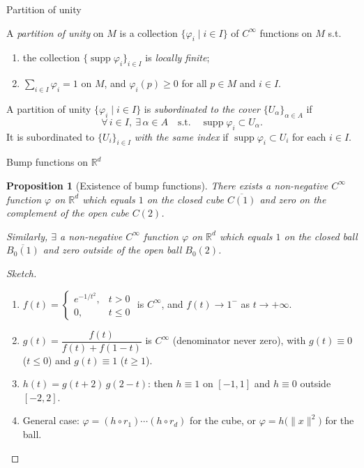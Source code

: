 \documentclass[10pt]{beamer}
\newtheorem{proposition}{Proposition}
\newcommand{\R}{\mathbb{R}}
\newcommand{\supp}{\operatorname{supp}}
\begin{document}
\begin{frame}{Partition of unity}
	\begin{definition}
		A \emph{partition of unity} on $M$ is a collection
		$\{\varphi_i \mid i \in I\}$ of $C^\infty$ functions on $M$ s.t.
		\begin{enumerate}
			\item[(a)] the collection $\{\supp \varphi_i\}_{i \in I}$ is
			      \emph{locally finite};
			\item[(b)] $\displaystyle\sum_{i \in I} \varphi_i = 1$ on $M$, and
			      $\varphi_i(p) \geq 0$ for all $p \in M$ and $i \in I$.
		\end{enumerate}
	\end{definition}
	\begin{definition}[Subordination]
		A partition of unity $\{\varphi_i \mid i \in I\}$ is
		\emph{subordinated to the cover} $\{U_\alpha\}_{\alpha \in A}$ if
		\[
			\forall\, i \in I,\ \exists\, \alpha \in A \quad \text{s.t.}\quad
			\supp \varphi_i \subset U_\alpha .
		\]
		It is subordinated to $\{U_i\}_{i \in I}$ \emph{with the same index}
		if $\supp \varphi_i \subset U_i$ for each $i \in I$.
	\end{definition}
\end{frame}

\begin{frame}{Bump functions on $\R^d$}
	\begin{proposition}[Existence of bump functions]
		There exists a non-negative $C^\infty$ function $\varphi$ on $\R^d$
		which equals $1$ on the closed cube $\overline{C(1)}$ and zero on the
		complement of the open cube $C(2)$.
		\par\smallskip
		Similarly, $\exists$ a non-negative $C^\infty$ function $\varphi$ on
		$\R^d$ which equals $1$ on the closed ball $\overline{B_0(1)}$ and
		zero outside of the open ball $B_0(2)$.
	\end{proposition}
	\begin{proof}[Sketch]
		\begin{enumerate}
			\item $f(t) = \begin{cases} e^{-1/t^2}, & t > 0 \\ 0, & t \leq 0 \end{cases}$
			      is $C^\infty$, and $f(t) \to 1^{-}$ as $t \to +\infty$.
			\item $g(t) = \dfrac{f(t)}{f(t) + f(1-t)}$ is $C^\infty$
			      (denominator never zero), with $g(t) \equiv 0$ ($t \leq 0$)
			      and $g(t) \equiv 1$ ($t \geq 1$).
			\item $h(t) = g(t+2)\, g(2-t)$: then $h \equiv 1$ on $[-1, 1]$ and
			      $h \equiv 0$ outside $[-2, 2]$.
			\item General case: $\varphi = (h \circ r_1) \cdots (h \circ r_d)$
			      for the cube, or $\varphi = h\bigl(\|x\|^2\bigr)$ for the ball.
		\end{enumerate}
	\end{proof}
\end{frame}
\end{document}
